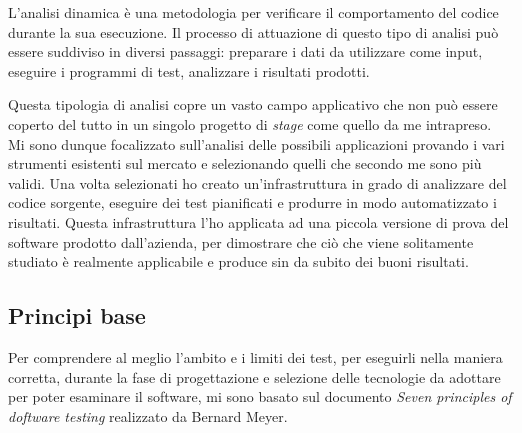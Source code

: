 L'analisi dinamica è una metodologia per verificare il comportamento del codice durante la sua esecuzione. Il processo di attuazione di questo tipo di analisi può essere suddiviso in diversi passaggi: preparare i dati da utilizzare come input, eseguire i programmi di test, analizzare i risultati prodotti.

Questa tipologia di analisi copre un vasto campo applicativo che non può essere coperto del tutto in un singolo progetto di \textit{stage} come quello da me intrapreso. Mi sono dunque focalizzato sull'analisi delle possibili applicazioni provando i vari strumenti esistenti sul mercato e selezionando quelli che secondo me sono più validi. Una volta selezionati ho creato un'infrastruttura in grado di analizzare del codice sorgente, eseguire dei test pianificati e produrre in modo automatizzato i risultati. Questa infrastruttura l'ho applicata ad una piccola versione di prova del software prodotto dall'azienda, per dimostrare che ciò che viene solitamente studiato è realmente applicabile e produce sin da subito dei buoni risultati.

\subsection{Principi base}

Per comprendere al meglio l'ambito e i limiti dei test, per eseguirli nella maniera corretta, durante la fase di progettazione e selezione delle tecnologie da adottare per poter esaminare il software, mi sono basato sul documento \textit{Seven principles of doftware testing} realizzato da Bernard Meyer.

